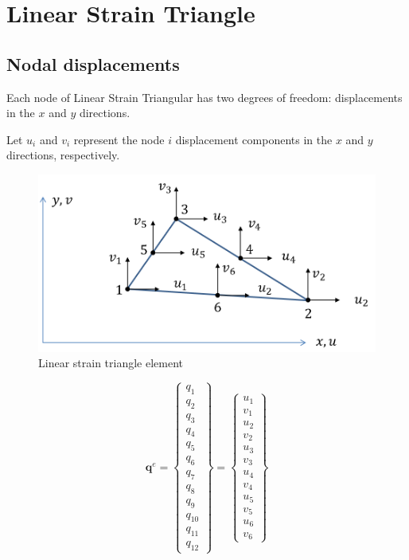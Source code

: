 
\section{Linear Strain Triangle}

\subsection{Nodal displacements}
Each node of Linear Strain Triangular has two degrees of freedom: displacements in the $ x $ and $ y $ directions.

Let $ u_i $ and $ v_i $ represent the node $ i $ displacement components in the $ x $ and $ y $ directions, respectively.

\begin{figure}[h!]
\centering
\includegraphics[width=0.7\linewidth]{figures/LST_element}
\caption{Linear strain triangle element}
\label{fig:LST_element}
\end{figure}

\begin{equation}
\mathbf{q}^e = \left\lbrace \begin{array}{c}
q_1 \\ 
q_2 \\ 
q_3 \\ 
q_4 \\ 
q_5 \\ 
q_6 \\
q_7 \\
q_8 \\
q_9 \\
q_{10} \\
q_{11} \\
q_{12}
\end{array} \right\rbrace = \left\lbrace \begin{array}{c}
u_1 \\ 
v_1 \\ 
u_2 \\ 
v_2 \\ 
u_3 \\ 
v_3 \\
u_4 \\
v_4 \\
u_5 \\
v_{5} \\
u_{6} \\
v_{6}
\end{array} \right\rbrace
\end{equation}

